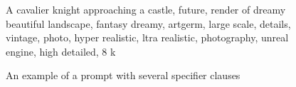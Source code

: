 \begin{figure}[h]
    \begin{center}
        A cavalier knight approaching a castle, future, render of dreamy beautiful landscape, fantasy dreamy, artgerm, large scale, details, vintage, photo, hyper realistic, ltra realistic, photography, unreal engine, high detailed, 8 k
    \end{center}
\caption{An example of a prompt with several specifier clauses \autocite{poloclub-diffusiondb}} %
\label{specifier_example}
\end{figure}

